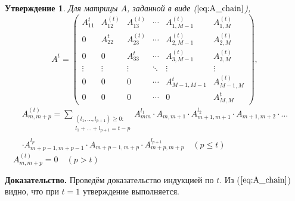 \documentclass[12pt]{article}
\newtheorem{state}{Утверждение}
\begin{document}
\begin{state}
\label{st:At}
Для матрицы $A$, заданной в виде \textup{(}$\ref{eq:A_chain}$\textup{)},
\begin{equation*}
	A^t = 
	\begin{pmatrix}
		A_{11}^t & A_{12}^{(t)} & A_{13}^{(t)} &  \cdots & A_{1,M-1}^{(t)} & A_{1,M}^{(t)} \\
		0 & A_{22}^t & A_{23}^{(t)} &  \cdots & A_{2,M-1}^{(t)} & A_{2,M}^{(t)} \\
		0 & 0 & A_{33}^t & \cdots & A_{3,M-1}^{(t)} & A_{3,M}^{(t)} \\
		\vdots & \vdots & \vdots & \ddots & \vdots & \vdots \\
		0 & 0 & 0 & \cdots & A_{M-1,M-1}^t & A_{M-1,M}^{(t)} \\
		0 & 0 & 0 & \cdots & 0 & A_{M,M}^t
	\end{pmatrix},
\end{equation*}
\begin{multline}
\label{eq:A_ij_common}
	A_{m,m+p}^{(t)} =	\sum_{\substack{(l_1,\ldots,l_{p+1}) \ge 0 :\\ l_1 + \ldots + l_{p+1} = t-p}} A_{mm}^{l_1} \cdot A_{m,m+1} \cdot A_{m+1,m+1}^{l_2} \cdot A_{m+1,m+2} \cdot \ldots \\
	\cdot A_{m+p-1,m+p-1}^{l_p} \cdot A_{m+p-1,m+p} \cdot A_{m+p,m+p}^{l_{p+1}}\quad (p \le t)
\end{multline}
$\quad A_{m,m+p}^{(t)} = 0\quad (p > t)$
\end{state}
\textbf{Доказательство. }
Проведём доказательство индукцией по $t$. Из ($\ref{eq:A_chain}$) видно, что при $t=1$ утверждение выполняется.
\end{document}
